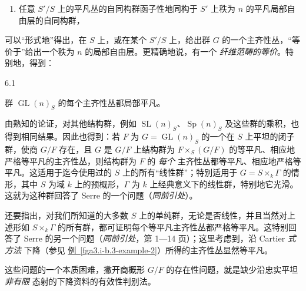 \begin{enumerate}
    
 \item[iii.]任意 \(S'/S\) 上的平凡丛的自同构群函子性地同构于 \(S'\) 上秩为 \(n\) 的平凡局部自由层的自同构群，

  \end{enumerate} 可以“形式地”得出，在 \(S\) 上，或在某个 \(S'/S\) 上，给出群 \(G\) 的一个主齐性丛，“等价于”给出一个秩为 \(n\) 的局部自由层。更精确地说，有一个 \emph{纤维范畴的等价}。特别地，得到：\begin{proposition}{6.1}\label{fga3.i-b.6-proposition-6.1}\skipsinglepar\par{}群 \(\operatorname {GL}(n)_S\) 的每个主齐性丛都局部平凡。\end{proposition}\par{}由熟知的论证，对其他结构群，例如 \(\operatorname {SL}(n)_S\)、\(\operatorname {Sp}(n)_S\) 及这些群的乘积，也得到相同结果。因此也得到：若 \(F\) 为 \(G=\operatorname {GL}(n)_S\) 的一个在 \(S\) 上平坦的闭子群，使商 \(G/F\) 存在，且 \(G\) 是 \(G/F\) 上结构群为 \(F\times _S(G/F)\) 的等平凡、相应地严格等平凡的主齐性丛，则结构群为 \(F\) 的 \emph{每个} 主齐性丛都等平凡、相应地严格等平凡。这适用于迄今使用过的 \(S\) 上的所有“线性群”；特别适用于 \(G=S\times _k\Gamma \) 的情形，其中 \(S\) 为域 \(k\) 上的预概形，\(\Gamma \) 为 \(k\) 上经典意义下的线性群，特别地它光滑。这就为这种群回答了 Serre 的一个问题（\emph{同前引处}）。\par{}还要指出，对我们所知道的大多数 \(S\) 上的单纯群，无论是否线性，并且当然对上述形如 \(S\times _k\Gamma \) 的所有群，都可证明每个等平凡主齐性丛都严格等平凡。这特别回答了 Serre 的另一个问题（\emph{同前引处}，第 1—14 页）；这里考虑到，沿 Cartier \emph{式方法} 下降（参见 \hyperref[fga3.i-b.3-example-2]{例~\ref*{fga3.i-b.3-example-2}}）所得的主齐性丛显然等平凡。\begin{remark}{}\label{fga3.i-b.6-remark}\skipsinglepar\par{}这些问题的一个本质困难，撇开商概形 \(G/F\) 的存在性问题，就是缺少沿忠实平坦 \emph{非有限} 态射的下降资料的有效性判别法。\end{remark}
